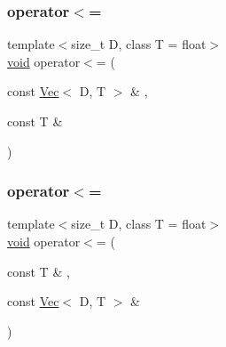 \mbox{\label{classtrimesh_1_1Vec_abd5f9708a2a26b804e9c55bc0ec00f8d}} 
\subsubsection{\texorpdfstring{operator$<$=}{operator<=}\hspace{0.1cm}{\footnotesize\ttfamily [1/2]}}
{\footnotesize\ttfamily template$<$size\+\_\+t D, class T = float$>$ \\
\hyperlink{namespacetrimesh_a784ddfd979e1c579bda795a8edfc3f43}{void} operator$<$= (\begin{DoxyParamCaption}\item[{const \hyperlink{classtrimesh_1_1Vec}{Vec}$<$ D, T $>$ \&}]{,  }\item[{const T \&}]{ }\end{DoxyParamCaption})\hspace{0.3cm}{\ttfamily [friend]}}

\mbox{\label{classtrimesh_1_1Vec_aa4d2343db642537fcd355c436f7e2d82}} 
\subsubsection{\texorpdfstring{operator$<$=}{operator<=}\hspace{0.1cm}{\footnotesize\ttfamily [2/2]}}
{\footnotesize\ttfamily template$<$size\+\_\+t D, class T = float$>$ \\
\hyperlink{namespacetrimesh_a784ddfd979e1c579bda795a8edfc3f43}{void} operator$<$= (\begin{DoxyParamCaption}\item[{const T \&}]{,  }\item[{const \hyperlink{classtrimesh_1_1Vec}{Vec}$<$ D, T $>$ \&}]{ }\end{DoxyParamCaption})\hspace{0.3cm}{\ttfamily [friend]}}

\mbox{\label{classtrimesh_1_1Vec_a5eca96db4999d9567b2bd0cc9848c77c}} 
